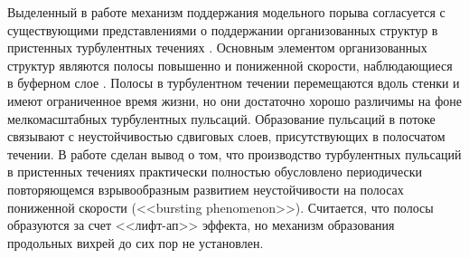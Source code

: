 Выделенный в работе механизм поддержания модельного порыва согласуется с существующими представлениями о поддержании организованных структур в пристенных турбулентных течениях \cite{Hamilton1995, Waleffe1995, Waleffe1997, Jimenez1999, Schoppa2002}. Основным элементом организованных структур являются полосы повышенно и пониженной скорости, наблюдающиеся в буферном слое \cite{Kline1967, Smith1983}. Полосы в турбулентном течении перемещаются вдоль стенки и имеют ограниченное время жизни, но они достаточно хорошо различимы на фоне мелкомасштабных турбулентных пульсаций. Образование пульсаций в потоке связывают с неустойчивостью сдвиговых слоев, присутствующих в полосчатом течении. В работе \cite{Kim1971} сделан вывод о том, что производство турбулентных пульсаций в пристенных течениях практически полностью обусловлено периодически повторяющемся взрывообразным развитием неустойчивости на полосах пониженной скорости (<<bursting phenomenon>>). Считается, что полосы образуются за счет <<лифт-ап>> эффекта, но механизм образования продольных вихрей до сих пор не установлен. 



 















